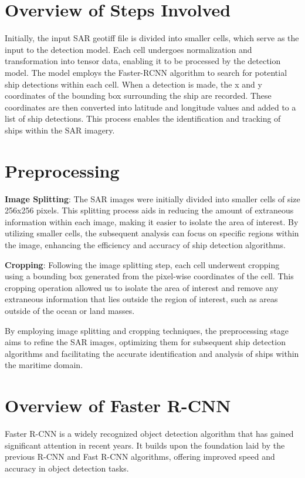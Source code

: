 \begin{sloppypar}
\section{Overview of Steps Involved}
Initially, the input SAR geotiff file is divided into smaller cells, which serve as the input to the detection model. Each cell undergoes normalization and transformation into tensor data, enabling it to be processed by the detection model. 
The model employs the Faster-RCNN algorithm to search for potential ship detections within each cell. When a detection is made, the x and y coordinates of the bounding box surrounding the ship are recorded. These coordinates are then converted into latitude and longitude values and added to a list of ship detections. This process enables the identification and tracking of ships within the SAR imagery.

\section{Preprocessing}
\textbf{Image Splitting}:
The SAR images were initially divided into smaller cells of size 256x256 pixels. This splitting process aids in reducing the amount of extraneous information within each image, making it easier to isolate the area of interest. By utilizing smaller cells, the subsequent analysis can focus on specific regions within the image, enhancing the efficiency and accuracy of ship detection algorithms.

\textbf{Cropping}:
Following the image splitting step, each cell underwent cropping using a bounding box generated from the pixel-wise coordinates of the cell. This cropping operation allowed us to isolate the area of interest and remove any extraneous information that lies outside the region of interest, such as areas outside of the ocean or land masses. 

By employing image splitting and cropping techniques, the preprocessing stage aims to refine the SAR images, optimizing them for subsequent ship detection algorithms and facilitating the accurate identification and analysis of ships within the maritime domain.

\newpage
\section{Overview of Faster R-CNN}
Faster R-CNN is a widely recognized object detection algorithm that has gained significant attention in recent years. It builds upon the foundation laid by the previous R-CNN and Fast R-CNN algorithms, offering improved speed and accuracy in object detection tasks.


\end{sloppypar}
